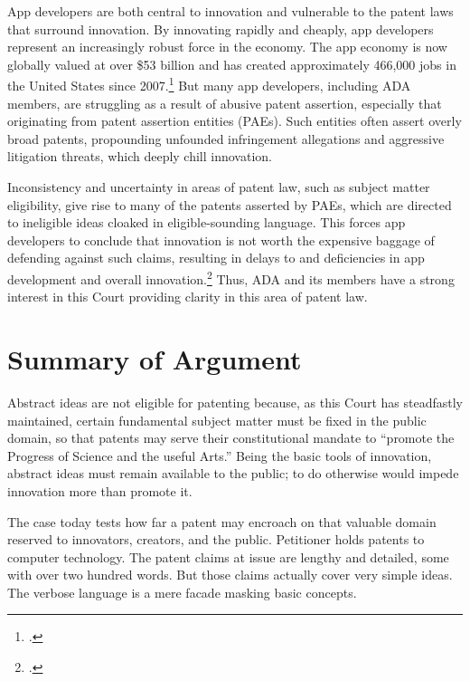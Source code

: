 \documentclass{scotus}
\begin{document}
App developers are both central to innovation and vulnerable to the patent laws
that surround innovation. By innovating rapidly and cheaply, app developers
represent an increasingly robust force in the economy. The app economy is now
globally valued at over \$53 billion and has
created approximately 466,000 jobs in the United States since
2007.\footnote{.} But many app developers,
including
ADA members, are struggling as a result of abusive patent assertion, especially
that originating from patent assertion entities (PAEs). Such entities often
assert overly broad patents, propounding unfounded infringement allegations and
aggressive litigation threats, which deeply chill innovation.

Inconsistency and uncertainty in areas of patent law, such as subject matter
eligibility, give rise to many of the patents asserted by PAEs, which are
directed to ineligible ideas cloaked in eligible-sounding language. This forces
app developers to conclude that innovation is not worth the expensive baggage of
defending against such claims, resulting in delays to and deficiencies in app
development and overall innovation.\footnote{.} Thus,
ADA and its members have a strong interest in this Court providing clarity in
this area of patent law.




\clearpage

\part{Summary of Argument}

Abstract ideas are not eligible for patenting because, as this Court has
steadfastly maintained, certain fundamental subject matter must be fixed in the
public domain, so that patents may serve their constitutional mandate to
``promote the Progress of Science and the useful Arts.'' Being the basic tools
of innovation, abstract ideas must remain available to the public; to do
otherwise would impede innovation more than promote it.

The case today tests how far a patent may encroach on that valuable domain
reserved to innovators, creators, and the public. Petitioner holds patents
to computer technology. The patent claims at issue are
lengthy and detailed, some with over two hundred words. But those claims
actually cover very simple ideas. The verbose language is a mere facade
masking basic concepts.
\end{document}
